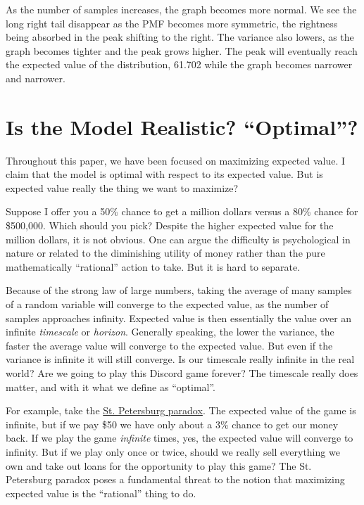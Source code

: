 \documentclass[11pt, oneside]{article}
\theoremstyle{plain}
\theoremstyle{definition}
\begin{document}
As the number of samples increases, the graph becomes more normal. We see the
long right tail disappear as the PMF becomes more symmetric, the rightness
being absorbed in the peak shifting to the right. The variance also lowers, as
the graph becomes tighter and the peak grows higher. The peak will eventually
reach the expected value of the distribution, 61.702 while the graph becomes
narrower and narrower.

\section{Is the Model Realistic? \enquote{Optimal}?} \label{subsec:conclusion}
Throughout this paper, we have been focused on maximizing expected
value. I claim that the model is optimal with respect to its expected
value. But is expected value really the thing we want to maximize?

Suppose I offer you a 50\% chance to get a million dollars versus a
80\% chance for \$500,000. Which should you pick? Despite the higher
expected value for the million dollars, it is not obvious. One can
argue the difficulty is psychological in nature or related to the
diminishing utility of money rather than the pure mathematically
\enquote{rational} action to take. But it is hard to separate.

Because of the strong law of large numbers, taking the average of many samples
of a random variable will converge to the expected value, as the number of
samples approaches infinity. Expected value is then essentially the value
over an infinite \textit{timescale} or \textit{horizon}. Generally speaking,
the lower the variance, the faster the average value will converge to the
expected value. But even if the variance is infinite it will still converge.
Is our timescale really infinite in the real world? Are we going to play this
Discord game forever? The timescale really does matter, and with it what we
define as \enquote{optimal}.

For example, take the
\href{https://plato.stanford.edu/entries/paradox-stpetersburg/}{St.
Petersburg paradox}. The expected value of the game is infinite, but if we
pay \$50 we have only about a 3\% chance to get our money back. If we play
the game \textit{infinite} times, yes, the expected value will converge
to infinity. But if we play only once or twice, should we really sell
everything we own and take out loans for the opportunity to play this game?
The St. Petersburg paradox poses a fundamental threat to the notion that
maximizing expected value is the \enquote{rational} thing to do.
\end{document}
